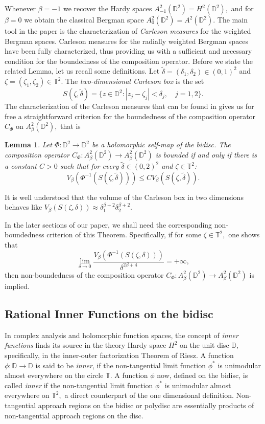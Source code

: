 \documentclass[12pt]{amsart}
\newtheorem{lemma}[theorem]{Lemma}
\numberwithin{equation}{section}
\begin{document}
Whenever $\beta=-1$ we recover the Hardy spaces $A^2_{-1}(\mathbb{D}^2)=H^2(\mathbb{D}^2),$ and for $\beta=0$ we obtain the classical Bergman space $A^2_0(\mathbb{D}^2)=A^2(\mathbb{D}^2).$ The main tool in the paper is the characterization of \textit{Carleson measures} for the weighted Bergman spaces. Carleson measures for the radially weighted Bergman spaces have been fully characterized, thus providing us with a sufficient and necessary condition for the boundedness of the composition operator. Before we state the related Lemma, let us recall some definitions. Let $\tilde{\delta}=(\delta_1,\delta_2)\in (0,1)^2$ and $\zeta=(\zeta_1,\zeta_2)\in\mathbb{T}^2.$ The \textit{two-dimensional Carleson box} is the set $$S(\zeta,\tilde{\delta})=\{z\in\mathbb{D}^2:|z_j-\zeta_j|<\delta_j, \quad j=1,2\}.$$ The characterization of the Carleson measures that can be found in \cite{carleson} gives us for free a straightforward criterion for the boundedness of the composition operator $C_{\Phi}$ on $A^2_{\beta}(\mathbb{D}^2),$ that is
\begin{lemma}
Let $\Phi:\mathbb{D}^2\to \mathbb{D}^2$ be a holomorphic self-map of the bidisc. The composition operator $C_{\Phi}: A^2_{\beta}(\mathbb{D}^2)\to A^2_{\beta}(\mathbb{D}^2)$ is bounded if and only if there is a constant $C>0$ such that for every $\tilde{\delta} \in (0,2)^2$ and $\zeta\in\mathbb{T}^2$:
$$V_{\beta}(\Phi^{-1}(S(\zeta,\tilde{\delta})))\leq CV_{\beta}(S(\zeta,\tilde{\delta})).$$
\end{lemma}
It is well understood that the volume of the Carleson box in two dimensions behaves like $V_{\beta}(S(\zeta,\delta))\approx\delta_1^{\beta+2}\delta_2^{\beta+2}.$

In the later sections of our paper, we shall need the corresponding non-boundedness criterion of this Theorem. Specifically, if for some $\zeta\in\mathbb{T}^2,$ one shows that
$$\lim_{\delta\to0}\frac{V_{\beta}(\Phi^{-1}(S(\zeta,\delta)))}{\delta^{2\beta+4}}=+\infty,$$
then non-boundedness of the composition operator $C_{\Phi}: A^2_{\beta}(\mathbb{D}^2)\to A^2_{\beta}(\mathbb{D}^2)$ is implied.

\subsection{Rational Inner Functions on the bidisc}\label{RIFs}
In complex analysis and holomorphic function spaces, the concept of \textit{inner functions} finds its source in the theory Hardy space $H^2$ on the unit disc $\mathbb{D},$ specifically, in the inner-outer factorization Theorem of Riesz. A function $\phi:\mathbb{D}\to\mathbb{D}$ is said to be \textit{inner}, if the non-tangential limit function $\phi^{*}$ is unimodular almost everywhere on the circle $\mathbb{T}.$ A function $\phi$ now, defined on the bidisc, is called \textit{inner} if the non-tangential limit function $\phi^*$ is unimodular almost everywhere on $\mathbb{T}^2,$ a direct counterpart of the one dimensional definition. Non-tangential approach regions on the bidisc or polydisc are essentially products of non-tangential approach regions on the disc. 
\end{document}
